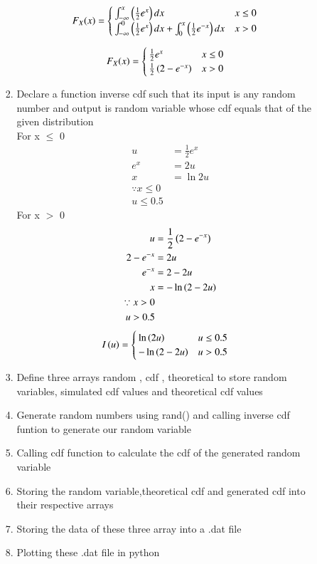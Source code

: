 \documentclass[journal,12pt,onecolumn]{IEEEtran}
\theoremstyle{remark}
\begin{document}
\begin{enumerate}
\begin{enumerate}
\begin{enumerate}
  \begin{align}
  F_X(x) &= 
  \begin{cases}
	  \int_{-\infty}^{x} \left(\frac{1}{2} e^{x}\right) dx  & x \le 0
  \\
	  \int_{-\infty}^{0} \left(\frac{1}{2} e^{x}\right) dx + \int_{0}^{x} \left(\frac{1}{2} e^{-x}\right) dx &  x > 0
  \end{cases}
  \end{align}

  \begin{align}
  F_X(x) &= 
  \begin{cases}
	  \frac{1}{2} e^{x} & x \le 0
  \\
	  \frac{1}{2} \left(2-e^{-x}\right) &  x > 0
  \end{cases}
  \end{align}
\item Declare a function inverse cdf  such that its input is any random number 
	and output is random variable whose cdf equals that of the given distribution\\
	For x $\le$ 0
		\begin{align}
			u &= \frac{1}{2} e^{x}\\
			e^{x} &= 2u\\
			x &= \ln{2u}\\
			\because x \le 0\\
			u \le 0.5
		\end{align}
	For x $>$ 0
		\begin{align}
			u &= \frac{1}{2} \left(2-e^{-x}\right)\\
			2-e^{-x} &= 2u\\
			e^{-x} &= 2-2u\\
			x &= -\ln \left(2-2u\right)\\
			\because x > 0\\
			u > 0.5
		\end{align}
  \begin{align}
  I\left(u\right) &=
  \begin{cases}
	  \ln\left(2u\right) & u \le 0.5
  \\
	  -\ln \left(2-2u\right) &  u > 0.5
  \end{cases}
  \end{align}
\item Define three arrays random , cdf
	, theoretical
	to store random variables, simulated cdf values and theoretical cdf values
\item Generate random numbers using rand() and calling inverse cdf funtion to generate our random variable
\item Calling cdf function to calculate the cdf of the generated random variable
\item Storing the random variable,theoretical cdf and generated cdf into their respective arrays
\item Storing the data of these three array into a .dat file
\item Plotting these .dat file in python
\end{enumerate}
\end{enumerate}
\end{enumerate}
\end{document}
